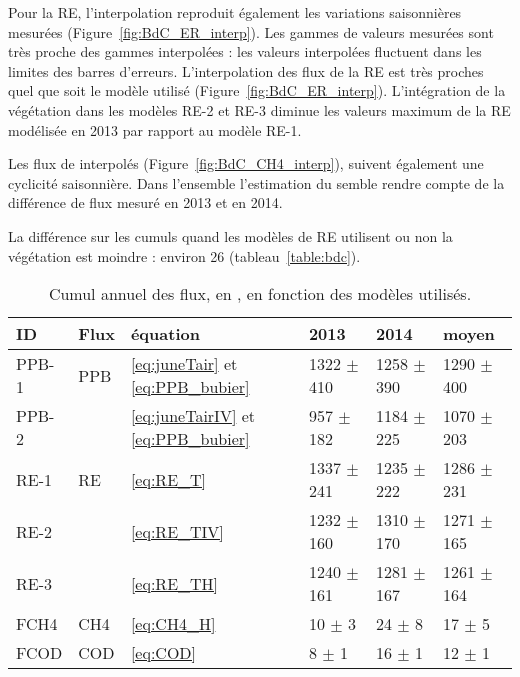 Pour la RE, l'interpolation reproduit également les variations saisonnières mesurées (Figure~\ref{fig:BdC_ER_interp}).
Les gammes de valeurs mesurées sont très proche des gammes interpolées :
les valeurs interpolées fluctuent dans les limites des barres d'erreurs.
L'interpolation des flux de la RE est très proches quel que soit le modèle utilisé (Figure~\ref{fig:BdC_ER_interp}).
L'intégration de la végétation dans les modèles RE-2 et RE-3 diminue les valeurs maximum de la RE modélisée en 2013 par rapport au modèle RE-1.

Les flux de \chh interpolés (Figure~\ref{fig:BdC_CH4_interp}), suivent également une cyclicité saisonnière.
Dans l'ensemble l'estimation du \chh semble rendre compte de la différence de flux mesuré en 2013 et en 2014.

La différence sur les cumuls quand les modèles de RE utilisent ou non la végétation est moindre : environ \SI{26}{\gcma} (tableau~\ref{table:bdc}).

\begin{table}
\centering
\caption{Cumul annuel des flux, en \si{\gcma}, en fonction des modèles utilisés.}
\label{table:flux}
\begin{tabular}{llllll}\toprule
ID & Flux & équation & 2013 & 2014 & moyen \\ \midrule
PPB-1 & PPB & \ref{eq:juneTair} et \ref{eq:PPB_bubier} & 1322 $\pm$ 410 & 1258 $\pm$ 390 & 1290 $\pm$ 400 \\
PPB-2 & & \ref{eq:juneTairIV} et \ref{eq:PPB_bubier} & 957 $\pm$ 182 & 1184 $\pm$ 225 & 1070 $\pm$ 203 \\[+1.5ex]
RE-1 & RE & \ref{eq:RE_T} & 1337 $\pm$ 241 & 1235 $\pm$ 222 & 1286 $\pm$ 231 \\
RE-2 & & \ref{eq:RE_TIV} & 1232 $\pm$ 160 & 1310 $\pm$ 170 & 1271 $\pm$ 165\\
RE-3 & & \ref{eq:RE_TH} & 1240 $\pm$ 161 & 1281 $\pm$ 167 & 1261 $\pm$ 164 \\[+1.5ex]
FCH4 & CH4 & \ref{eq:CH4_H} & 10 $\pm$ 3 & 24 $\pm$ 8 & 17 $\pm$ 5 \\[+1.5ex]
FCOD & COD & \ref{eq:COD} & 8 $\pm$ 1  & 16 $\pm$ 1 & 12 $\pm$ 1 \\
\bottomrule
\end{tabular}
\end{table}


